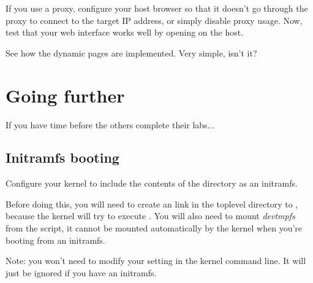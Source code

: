 If you use a proxy, configure your host browser so that it doesn't go
through the proxy to connect to the target IP address, or simply
disable proxy usage.  Now, test that your web interface works well by
opening  on the host.

See how the dynamic pages are implemented. Very simple, isn't it?

\section{Going further}

If you have time before the others complete their labs...

\subsection{Initramfs booting}

Configure your kernel to include the contents of the 
directory as an initramfs.

Before doing this, you will need to create an  link in the
toplevel directory to , because the kernel will try to
execute . You will also need to mount {\em devtmpfs} from
the  script, it cannot be mounted automatically by the kernel
when you're booting from an initramfs.

Note: you won't need to modify your  setting in the kernel
command line. It will just be ignored if you have an initramfs.

